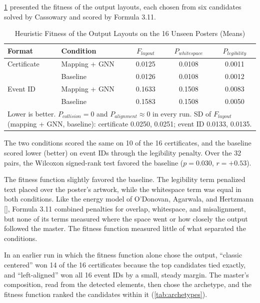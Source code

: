 \begin{refsection}
\ref{tab:fitness} presented the fitness of the output layouts, each chosen from six candidates solved by Cassowary and scored by Formula 3.11.

\begin{table}[!ht]
\centering
\caption{Heuristic Fitness of the Output Layouts on the 16 Unseen Posters (Means)}
\label{tab:fitness}
\begin{tabular}{l l c c c}
\hline
\textbf{Format} & \textbf{Condition} & \textbf{$F_{layout}$} & \textbf{$P_{whitespace}$} & \textbf{$P_{legibility}$} \\ \hline
Certificate & Mapping + GNN & 0.0125 & 0.0108 & 0.0011 \\
 & Baseline & 0.0126 & 0.0108 & 0.0012 \\ \hline
Event ID & Mapping + GNN & 0.1633 & 0.1508 & 0.0083 \\
 & Baseline & 0.1583 & 0.1508 & 0.0050 \\ \hline
\multicolumn{5}{p{0.80\textwidth}}{\footnotesize Lower is better. $P_{collision} = 0$ and $P_{alignment} \approx 0$ in every run. SD of $F_{layout}$ (mapping + GNN, baseline): certificate 0.0250, 0.0251; event ID 0.0133, 0.0135.}
\end{tabular}
\end{table}

The two conditions scored the same on 10 of the 16 certificates, and the baseline scored lower (better) on event IDs through the legibility penalty. Over the 32 pairs, the Wilcoxon signed-rank test favored the baseline ($p = 0.030$, $r = +0.53$).

The fitness function slightly favored the baseline. The legibility term penalized text placed over the poster's artwork, while the whitespace term was equal in both conditions. Like the energy model of O'Donovan, Agarwala, and Hertzmann [\citeyear{ODonovan2014Layouts}], Formula 3.11 combined penalties for overlap, whitespace, and misalignment, but none of its terms measured where the space went or how closely the output followed the master. The fitness function measured little of what separated the conditions.

\clearpage
In an earlier run in which the fitness function alone chose the output, ``classic centered'' won 14 of the 16 certificates because the top candidates tied exactly, and ``left-aligned'' won all 16 event IDs by a small, steady margin. The master's composition, read from the detected elements, then chose the archetype, and the fitness function ranked the candidates within it (\ref{tab:archetypes}).


\end{refsection}
